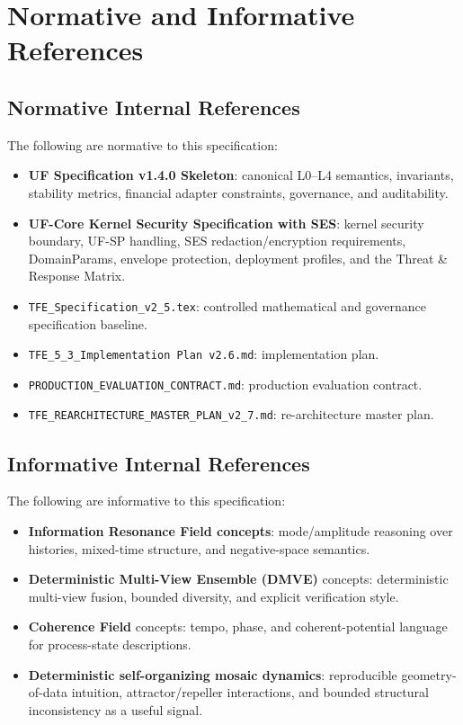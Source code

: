 \chapter{Normative and Informative References}
\section{Normative Internal References}

The following are normative to this specification:
\begin{itemize}
    \item \textbf{UF Specification v1.4.0 Skeleton}: canonical L0--L4 semantics, invariants, stability metrics, financial adapter constraints, governance, and auditability.
    \item \textbf{UF-Core Kernel Security Specification with SES}: kernel security boundary, UF-SP handling, SES redaction/encryption requirements, DomainParams, envelope protection, deployment profiles, and the Threat \& Response Matrix.
    \item \texttt{TFE\_Specification\_v2\_5.tex}: controlled mathematical and governance specification baseline.
    \item \texttt{TFE\_5\_3\_Implementation Plan v2.6.md}: implementation plan.
    \item \texttt{PRODUCTION\_EVALUATION\_CONTRACT.md}: production evaluation contract.
    \item \texttt{TFE\_REARCHITECTURE\_MASTER\_PLAN\_v2\_7.md}: re-architecture master plan.
\end{itemize}

\section{Informative Internal References}

The following are informative to this specification:
\begin{itemize}
    \item \textbf{Information Resonance Field concepts}: mode/amplitude reasoning over histories, mixed-time structure, and negative-space semantics.
    \item \textbf{Deterministic Multi-View Ensemble (DMVE)} concepts: deterministic multi-view fusion, bounded diversity, and explicit verification style.
    \item \textbf{Coherence Field} concepts: tempo, phase, and coherent-potential language for process-state descriptions.
    \item \textbf{Deterministic self-organizing mosaic dynamics}: reproducible geometry-of-data intuition, attractor/repeller interactions, and bounded structural inconsistency as a useful signal.
\end{itemize}

